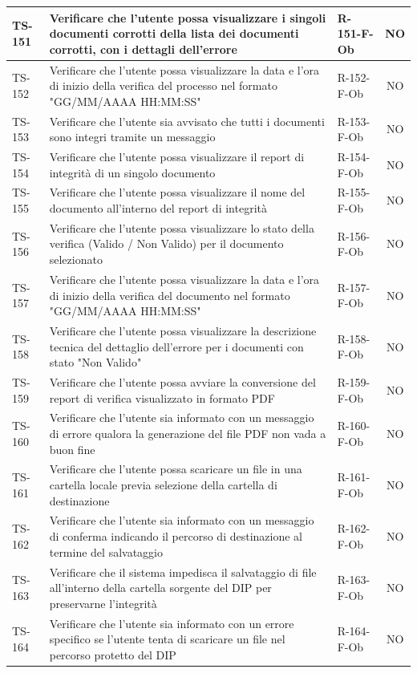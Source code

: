 \documentclass[a4paper,12pt]{article}
\begin{document}
\begin{longtable}{|p{1.5cm}|p{8.3cm}|p{2.4cm}|c|}
\hline
TS-151 & Verificare che l'utente possa visualizzare i singoli documenti corrotti della lista dei documenti corrotti, con i dettagli dell'errore & R-151-F-Ob & NO \\
\hline
TS-152 & Verificare che l'utente possa visualizzare la data e l'ora di inizio della verifica del processo nel formato "GG/MM/AAAA HH:MM:SS" & R-152-F-Ob & NO \\
\hline
TS-153 & Verificare che l'utente sia avvisato che tutti i documenti sono integri tramite un messaggio & R-153-F-Ob & NO \\
\hline
TS-154 & Verificare che l'utente possa visualizzare il report di integrità di un singolo documento & R-154-F-Ob & NO \\
\hline
TS-155 & Verificare che l'utente possa visualizzare il nome del documento all'interno del report di integrità & R-155-F-Ob & NO \\
\hline
TS-156 & Verificare che l'utente possa visualizzare lo stato della verifica (Valido / Non Valido) per il documento selezionato & R-156-F-Ob & NO \\
\hline
TS-157 & Verificare che l'utente possa visualizzare la data e l'ora di inizio della verifica del documento nel formato "GG/MM/AAAA HH:MM:SS" & R-157-F-Ob & NO \\
\hline
TS-158 & Verificare che l'utente possa visualizzare la descrizione tecnica del dettaglio dell'errore per i documenti con stato "Non Valido" & R-158-F-Ob & NO \\
\hline
TS-159 & Verificare che l'utente possa avviare la conversione del report di verifica visualizzato in formato PDF & R-159-F-Ob & NO \\
\hline
TS-160 & Verificare che l'utente sia informato con un messaggio di errore qualora la generazione del file PDF non vada a buon fine & R-160-F-Ob & NO \\
\hline
TS-161 & Verificare che l'utente possa scaricare un file in una cartella locale previa selezione della cartella di destinazione & R-161-F-Ob & NO \\
\hline
TS-162 & Verificare che l'utente sia informato con un messaggio di conferma indicando il percorso di destinazione al termine del salvataggio & R-162-F-Ob & NO \\
\hline
TS-163 & Verificare che il sistema impedisca il salvataggio di file all'interno della cartella sorgente del DIP per preservarne l'integrità & R-163-F-Ob & NO \\
\hline
TS-164 & Verificare che l'utente sia informato con un errore specifico se l'utente tenta di scaricare un file nel percorso protetto del DIP & R-164-F-Ob & NO \\

\end{longtable}
\end{document}

